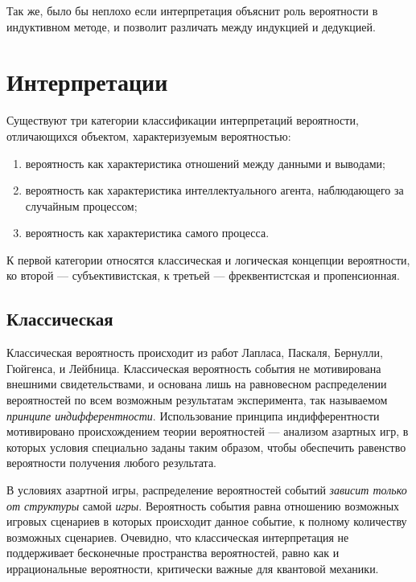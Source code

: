 \documentclass[14pt, a4paper, pdftex]{extarticle}
\begin{document}
Так же, было бы неплохо если интерпретация объяснит роль вероятности в индуктивном методе, и позволит различать между индукцией и дедукцией.

\section{Интерпретации}

Существуют три категории классификации интерпретаций вероятности, отличающихся объектом, характеризуемым вероятностью:
\begin{enumerate}
\item вероятность как характеристика отношений между данными и выводами;
\item вероятность как характеристика интеллектуального агента, наблюдающего за случайным процессом;
\item вероятность как характеристика самого процесса.
\end{enumerate}

К первой категории относятся классическая и логическая концепции вероятности, ко второй --- субъективистская, к третьей --- фреквентистская и пропенсионная.

\subsection{Классическая}

Классическая вероятность происходит из работ Лапласа, Паскаля, Бернулли, Гюйгенса, и Лейбница. Классическая вероятность события не мотивирована внешними свидетельствами, и основана лишь на равновесном распределении вероятностей по всем возможным результатам эксперимента, так называемом \emph{принципе индифферентности}. Использование принципа индифферентности мотивировано происхождением теории вероятностей --- анализом азартных игр, в которых условия специально заданы таким образом, чтобы обеспечить равенство вероятности получения любого результата. 

В условиях азартной игры, распределение вероятностей событий \emph{зависит только от структуры} самой \emph{игры}. Вероятность события равна отношению возможных игровых сценариев в которых происходит данное событие, к полному количеству возможных сценариев. Очевидно, что классическая интерпретация не поддерживает бесконечные пространства вероятностей, равно как и иррациональные вероятности, критически важные для квантовой механики.\\
\end{document}
